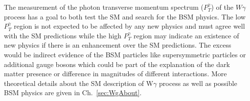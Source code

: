 The measurement of the photon transverse momentum spectrum ($P_T^{\gamma}$) of the $W\gamma$ process has a goal to both test the SM and search for the BSM physics. The low $P_T^{\gamma}$ region is not expected to be affected by any new physics and must agree well with the SM predictions while the high $P_T^{\gamma}$ region may indicate an existence of new physics if there is an enhancement over the SM predictions. The excess would be indirect evidence of the BSM particles like supersymmetric particles or additional gauge bosons which could be part of the explanation of the dark matter presence or difference in magnitudes of different interactions. More theoretical details about the SM description of W$\gamma$ process as well as possible BSM physics are given in Ch.~\ref{sec:WgAbout}.    


